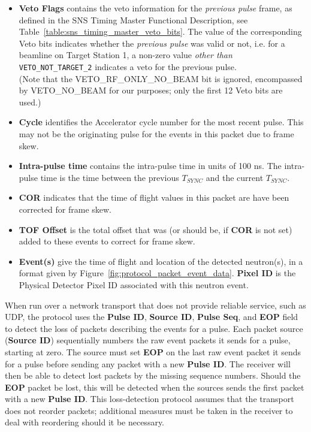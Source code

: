 \begin{itemize}
(e.g. RTDL\_STATUS\_*) as defined in the SNS Timing Master
Functional Description.
\item{\bf Veto Flags} contains the veto information
for the {\it previous pulse} frame,
as defined in the SNS Timing Master Functional Description,
see Table~\ref{table:sns_timing_master_veto_bits}.
The value of the corresponding Veto bits indicates whether the
{\it previous pulse} was valid or not,
i.e. for a beamline on Target Station 1,
a non-zero value {\it other than } {\tt VETO\_NOT\_TARGET\_2}
indicates a veto for the previous pulse. \\
(Note that the VETO\_RF\_ONLY\_NO\_BEAM bit is ignored,
encompassed by VETO\_NO\_BEAM for our purposes;
only the first 12 Veto bits are used.)
\item{\bf Cycle} identifies the Accelerator cycle number for the most
recent pulse. This may not be the originating pulse for the events in this
packet due to frame skew.
\item{\bf Intra-pulse time} contains the intra-pulse time in units of 100 ns.
The intra-pulse time is the time between the previous $T_{SYNC}$ and the
current $T_{SYNC}$.
\item{\bf COR} indicates that the time of flight values in this packet are
have been corrected for frame skew.
\item{\bf TOF Offset} is the total offset that was (or should be, if {\bf COR}
is not set) added to these events to correct for frame skew.
\item{\bf Event(s)} give the time of flight and location of the detected
neutron(s), in a format given by Figure~\ref{fig:protocol_packet_event_data}.
{\bf Pixel ID} is the Physical Detector Pixel ID
associated with this neutron event.
\end{itemize}

When run over a network transport that does not provide reliable service, such
as UDP, the protocol uses the {\bf Pulse ID}, {\bf Source ID}, {\bf Pulse Seq},
and {\bf EOP} field to detect the loss of packets describing the events for a
pulse. Each packet source ({\bf Source ID}) sequentially numbers the raw event
packets it sends for a pulse, starting at zero. The source must set {\bf EOP}
on the last raw event packet it sends for a pulse before sending any packet
with a new {\bf Pulse ID}. The receiver will then be able to detect lost
packets by the missing sequence numbers. Should the {\bf EOP} packet be lost,
this will be detected when the sources sends the first packet with a new {\bf
Pulse ID}. This loss-detection protocol assumes that the transport does not
reorder packets; additional measures must be taken in the receiver
to deal with reordering should it be necessary.


